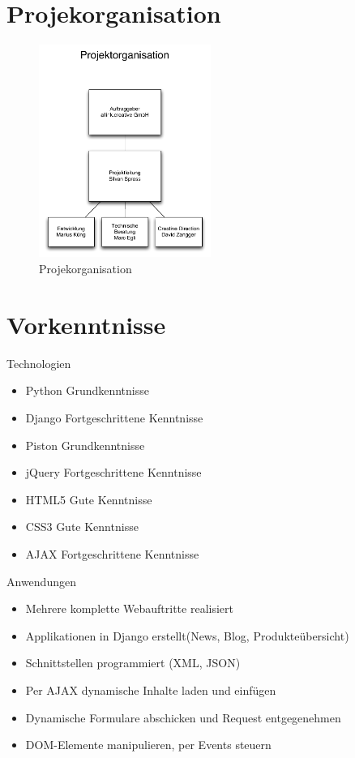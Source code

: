 \section{Projekorganisation}

\begin{figure}[!ht]
\begin{center}
\includegraphics[width=0.5\textwidth,angle=0]{./bilder/01_projektorganisation.pdf}
\caption[Projekorganisation]{Projekorganisation\footnotemark}
\label{Projekorganisation}
\end{center}
\end{figure}

\section{Vorkenntnisse}

Technologien
\begin{itemize}
    \item Python Grundkenntnisse
    \item Django Fortgeschrittene Kenntnisse
    \item Piston Grundkenntnisse
    \item jQuery Fortgeschrittene Kenntnisse
    \item HTML5 Gute Kenntnisse
    \item CSS3 Gute Kenntnisse
    \item AJAX Fortgeschrittene Kenntnisse
\end{itemize}

Anwendungen
\begin{itemize}
    \item Mehrere komplette Webauftritte realisiert
    \item Applikationen in Django erstellt(News, Blog, Produkteübersicht)
    \item Schnittstellen programmiert (XML, JSON)
    \item Per AJAX dynamische Inhalte laden und einfügen
    \item Dynamische Formulare abschicken und Request entgegenehmen
    \item DOM-Elemente manipulieren, per Events steuern
\end{itemize}
    
